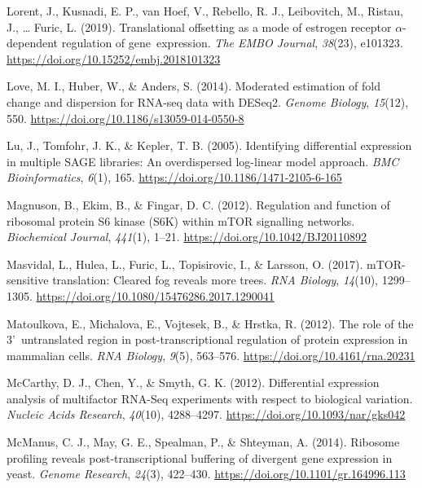 \documentclass[12pt,openany]{book}
\begin{document}
\hypertarget{ref-Lorent2019}{}
Lorent, J., Kusnadi, E. P., van Hoef, V., Rebello, R. J., Leibovitch,
M., Ristau, J., \ldots{} Furic, L. (2019). Translational offsetting as a
mode of estrogen receptor \(\alpha\)-dependent regulation of
gene~expression. \emph{The EMBO Journal}, \emph{38}(23), e101323.
\url{https://doi.org/10.15252/embj.2018101323}

\hypertarget{ref-Love2014}{}
Love, M. I., Huber, W., \& Anders, S. (2014). Moderated estimation of
fold change and dispersion for RNA-seq data with DESeq2. \emph{Genome
Biology}, \emph{15}(12), 550.
\url{https://doi.org/10.1186/s13059-014-0550-8}

\hypertarget{ref-Lu2005}{}
Lu, J., Tomfohr, J. K., \& Kepler, T. B. (2005). Identifying
differential expression in multiple SAGE libraries: An overdispersed
log-linear model approach. \emph{BMC Bioinformatics}, \emph{6}(1), 165.
\url{https://doi.org/10.1186/1471-2105-6-165}

\hypertarget{ref-Magnuson2012}{}
Magnuson, B., Ekim, B., \& Fingar, D. C. (2012). Regulation and function
of ribosomal protein S6 kinase (S6K) within mTOR signalling networks.
\emph{Biochemical Journal}, \emph{441}(1), 1--21.
\url{https://doi.org/10.1042/BJ20110892}

\hypertarget{ref-Masvidal2017}{}
Masvidal, L., Hulea, L., Furic, L., Topisirovic, I., \& Larsson, O.
(2017). mTOR-sensitive translation: Cleared fog reveals more trees.
\emph{RNA Biology}, \emph{14}(10), 1299--1305.
\url{https://doi.org/10.1080/15476286.2017.1290041}

\hypertarget{ref-Matoulkova2012}{}
Matoulkova, E., Michalova, E., Vojtesek, B., \& Hrstka, R. (2012). The
role of the 3'~untranslated region in post-transcriptional regulation of
protein expression in mammalian cells. \emph{RNA Biology}, \emph{9}(5),
563--576. \url{https://doi.org/10.4161/rna.20231}

\hypertarget{ref-McCarthy2012}{}
McCarthy, D. J., Chen, Y., \& Smyth, G. K. (2012). Differential
expression analysis of multifactor RNA-Seq experiments with respect to
biological variation. \emph{Nucleic Acids Research}, \emph{40}(10),
4288--4297. \url{https://doi.org/10.1093/nar/gks042}

\hypertarget{ref-McManus2014}{}
McManus, C. J., May, G. E., Spealman, P., \& Shteyman, A. (2014).
Ribosome profiling reveals post-transcriptional buffering of divergent
gene expression in yeast. \emph{Genome Research}, \emph{24}(3),
422--430. \url{https://doi.org/10.1101/gr.164996.113}
\end{document}

